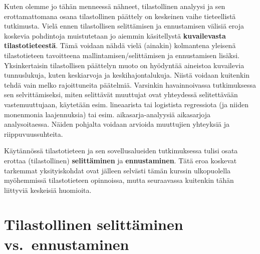 \documentclass[
]{book}
\begin{document}
Kuten olemme jo tähän menneessä nähneet, tilastollinen analyysi ja sen erottamattomana osana tilastollinen päättely on keskeinen vaihe tieteellistä tutkimusta. Vielä ennen tilastollisen selittämisen ja ennustamisen välisiä eroja koskevia pohdintoja muistutetaan jo aiemmin käsitellystä \textbf{kuvailevasta tilastotieteestä}. Tämä voidaan nähdä vielä (ainakin) kolmantena yleisenä tilastotieteen tavoitteena mallintamisen/selittämisen ja ennustamisen lisäksi. Yksinkertaisin tilastollisen päättelyn muoto on hyödyntää aineistoa kuvailevia tunnuslukuja, kuten keskiarvoja ja keskihajontalukuja. Niistä voidaan kuitenkin tehdä vain melko rajoittuneita päätelmiä. Varsinkin havainnoivassa tutkimuksessa sen selvittämiseksi, miten selittävät muuttujat ovat yhteydessä selitettävään vastemuuttujaan, käytetään esim. lineaarista tai logistista regressiota (ja niiden monenmonia laajennuksia) tai esim. aikasarja-analyysiä aikasarjoja analysoitaessa. Näiden pohjalta voidaan arvioida muuttujien yhteyksiä ja riippuvuussuhteita.

Käytännössä tilastotieteen ja sen sovellusalueiden tutkimuksessa tulisi osata erottaa (tilastollinen) \textbf{selittäminen} ja \textbf{ennustaminen}. Tätä eroa koskevat tarkemmat yksityiskohdat ovat jälleen selvästi tämän kurssin ulkopuolella myöhemmissä tilastotieteen opinnoissa, mutta seuraavassa kuitenkin tähän liittyviä keskeisiä huomioita.

\hypertarget{alaluku131}{%
\section{Tilastollinen selittäminen vs.~ennustaminen}\label{alaluku131}}
\end{document}
